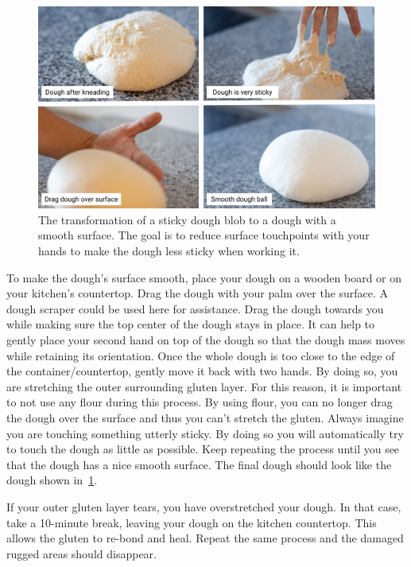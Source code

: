 \begin{figure}[!htb]
  \includegraphics[width=\textwidth]{dough-ball-steps}
  \caption{The transformation of a sticky dough blob to a dough
  with a smooth surface. The goal is to reduce surface touchpoints
  with your hands to make the dough less sticky when working it.}%
  \label{fig:dough-ball-steps}
\end{figure}

To make the dough's surface smooth, place your dough on a wooden board or
on your kitchen's countertop. Drag the dough with your palm over the surface.
A dough scraper could be used here for assistance.
Drag the dough towards you while making sure the top center of the dough stays in place.
It can help to gently place your second hand on top of the dough so that
the dough mass moves while retaining its orientation. Once the whole dough
is too close to the edge of the container/countertop, gently move it back
with two hands. By doing so, you are stretching the outer surrounding gluten layer.
For this reason, it is important to not use any flour during this process.
By using flour, you can no longer drag the dough over the surface and thus
you can't stretch the gluten. Always imagine you are touching something utterly sticky.
By doing so you will automatically try to touch the dough as little
as possible. Keep repeating the process until you see that the dough
has a nice smooth surface. The final dough should look like the dough
shown in~\ref{fig:dough-ball-steps}.

If your outer gluten layer tears, you have overstretched your dough. In
that case, take a 10-minute break, leaving your dough on the kitchen countertop.
This allows the gluten to re-bond and heal. Repeat the same process
and the damaged rugged areas should disappear.

